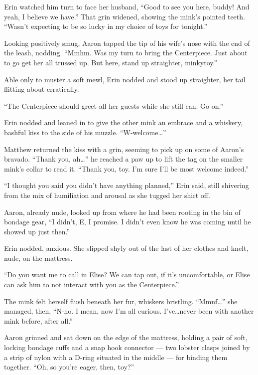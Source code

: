 Erin watched him turn to face her husband, ``Good to see you here, buddy! And yeah, I believe we have.'' That grin widened, showing the mink's pointed teeth. ``Wasn't expecting to be so lucky in my choice of toys for tonight.''

Looking positively smug, Aaron tapped the tip of his wife's nose with the end of the leash, nodding. ``Mmhm. Was my turn to bring the Centerpiece. Just about to go get her all trussed up. But here, stand up straighter, minkytoy.''

Able only to muster a soft mewl, Erin nodded and stood up straighter, her tail flitting about erratically.

``The Centerpiece should greet all her guests while she still can. Go on.''

Erin nodded and leaned in to give the other mink an embrace and a whiskery, bashful kiss to the side of his muzzle. ``W-welcome\ldots{}''

Matthew returned the kiss with a grin, seeming to pick up on some of Aaron's bravado. ``Thank you, ah\ldots{}'' he reached a paw up to lift the tag on the smaller mink's collar to read it. ``Thank you, toy. I'm sure I'll be most welcome indeed.''

\secdiv{}

\noindent ``I thought you said you didn't have anything planned,'' Erin said, still shivering from the mix of humiliation and arousal as she tugged her shirt off.

Aaron, already nude, looked up from where he had been rooting in the bin of bondage gear, ``I didn't, E, I promise. I didn't even know he was coming until he showed up just then.''

Erin nodded, anxious. She slipped shyly out of the last of her clothes and knelt, nude, on the mattress.

``Do you want me to call in Elise? We can tap out, if it's uncomfortable, or Elise can ask him to not interact with you as the Centerpiece.''

The mink felt herself flush beneath her fur, whiskers bristling. ``Mmnf\ldots{}'' she managed, then, ``N-no. I mean, now I'm all curious. I've\ldots{}never been with another mink before, after all.''

Aaron grinned and sat down on the edge of the mattress, holding a pair of soft, locking bondage cuffs and a snap hook connector --- two lobster clasps joined by a strip of nylon with a D-ring situated in the middle --- for binding them together. ``Oh, so you're eager, then, toy?''

